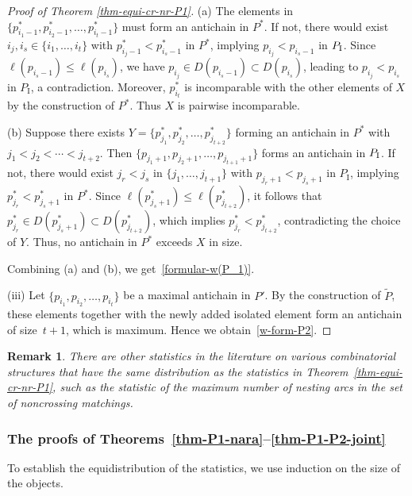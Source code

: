 \documentclass[11pt]{article}
\newtheorem{remark}[thm]{Remark}
\begin{document}
\begin{proof}[Proof of Theorem \ref{thm-equi-cr-nr-P1}]
		(a) The elements in $\{p^*_{i_1 - 1}, p^*_{i_2 - 1},\ldots, p^*_{i_t - 1}\}$ must form an antichain in $P^*$. If not, there would exist $i_j, i_s \in \{i_1, \ldots, i_t\}$ with $p^*_{i_j-1} < p^*_{i_s-1}$ in $P^*$, implying $p_{i_j} < p_{i_s-1}$ in $P_{\rm I}$. Since $\ell(p_{i_s-1}) \leq \ell(p_{i_s})$, we have $p_{i_j}\in D(p_{i_s-1}) \subset D(p_{i_s})$, leading to $p_{i_j} < p_{i_s}$ in $P_{\text{I}}$, a contradiction. 
		Moreover, $p^*_{i_t}$ is incomparable with the other elements of $X$ by the construction of $P^*$.
		Thus $X$ is pairwise incomparable.
		
		(b) Suppose there exists \( Y = \{p^*_{j_1}, p^*_{j_2},\ldots, p^*_{j_{t+2}}\} \) forming an antichain in \( P^* \) with \( j_1 < j_2< \cdots < j_{t+2} \). Then \( \{p_{j_1+1}, p_{j_2+1}, \ldots, p_{j_{t+1}+1}\} \) forms an antichain in \( P_{\rm I}\). 
		If not, there would exist \( j_r < j_s \) in \( \{j_1, \ldots, j_{t+1}\} \) with \( p_{j_r+1} < p_{j_s+1} \) in \( P_{\text{I}} \), implying \( p^*_{j_r} < p^*_{j_s+1} \) in \( P^* \). Since \( \ell(p^*_{j_s+1}) \leq \ell(p^*_{j_{t+2}}) \), it follows that \( p^*_{j_r}\in D(p^*_{j_s+1}) \subset D(p^*_{j_{t+2}}) \), which implies \( p^*_{j_r} < p^*_{j_{t+2}} \), contradicting the choice of \( Y \).
		Thus, no antichain in \( P^* \) exceeds \( X \) in size.
		
		\noindent
		Combining (a) and (b), we get~\eqref{formular-w(P_1)}.
		
		\noindent
		(iii) Let $\{p_{i_1},p_{i_2},\dots,p_{i_{t}}\}$ be a maximal antichain in $P'$.
		By the construction of $\widetilde{P}$, these elements together with the newly added isolated element form an antichain of size~$t+1$, which is maximum. Hence we obtain~\eqref{w-form-P2}.
	\end{proof}
	
	\begin{remark} There are other statistics in the literature on various combinatorial structures that have the same distribution as the statistics in Theorem~\ref{thm-equi-cr-nr-P1}, such as the statistic of the maximum number of nesting arcs in the set of noncrossing matchings.  \end{remark}
	
	\subsubsection{The proofs of Theorems~\ref{thm-P1-nara}--\ref{thm-P1-P2-joint}}\label{proofs-three-theorems}
	
	To establish the equidistribution of the statistics, we use induction on the size of the objects.
	
\end{document}
